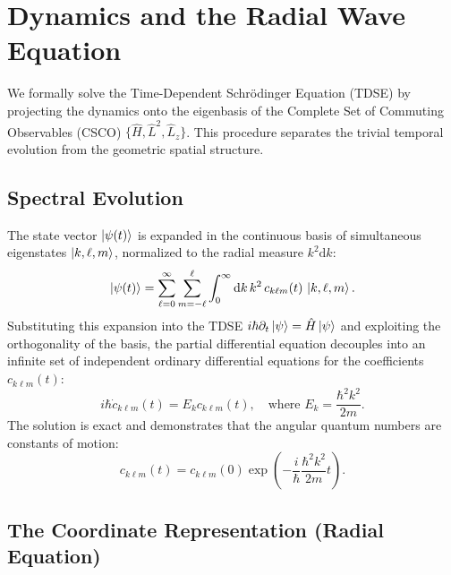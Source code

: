 \section{Dynamics and the Radial Wave Equation}

We formally solve the Time-Dependent Schrödinger Equation (TDSE) by projecting
the dynamics onto the eigenbasis of the Complete Set of Commuting Observables
(CSCO) $\{ \hat{H}, \hat{L}^2, \hat{L}_z \}$. This procedure separates the
trivial temporal evolution from the geometric spatial structure.

\subsection{Spectral Evolution}

The state vector $\ket{\psi(t)}$ is expanded in the continuous basis of
simultaneous eigenstates $\ket{k, \ell, m}$, normalized to the radial measure
$k^2 \mathrm{d}k$:
\begin{equation}
	\ket{\psi(t)} = \sum_{\ell=0}^{\infty} \sum_{m=-\ell}^{\ell}
	\int_{0}^{\infty} \mathrm{d}k \, k^2 \, c_{k\ell m}(t) \, \ket{k, \ell, m}.
\end{equation}
Substituting this expansion into the TDSE $i\hbar \partial_t \ket{\psi} =
\hat{H}\ket{\psi}$ and exploiting the orthogonality of the basis, the partial
differential equation decouples into an infinite set of independent ordinary
differential equations for the coefficients $c_{k\ell m}(t)$:
\begin{equation}
	i\hbar \dot{c}_{k\ell m}(t) = E_k c_{k\ell m}(t), \quad \text{where } E_k =
	\frac{\hbar^2 k^2}{2m}.
\end{equation}
The solution is exact and demonstrates that the angular quantum numbers are
constants of motion:
\begin{equation}
	c_{k\ell m}(t) = c_{k\ell m}(0) \exp\left( -\frac{i}{\hbar} \frac{\hbar^2
	k^2}{2m} t \right).
\end{equation}

\subsection{The Coordinate Representation (Radial Equation)}

